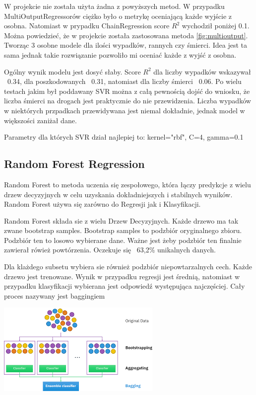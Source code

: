 \documentclass{article}
\begin{document}
W projekcie nie została użyta żadna z powyższych metod. W przypadku MultiOutputRegressorów ciężko było o metrykę oceniającą każde wyjście z osobna. Natomiast w prypadku ChainRegression score \(R^2\) wychodził poniżej 0.1. 
Można powiedzieć, że w projekcie została zastosowana metoda \ref{fig:multioutput}. Tworząc 3 osobne modele dla ilości wypadków, rannych czy śmierci. Idea jest ta sama jednak takie rozwiązanie pozwoliło mi oceniać każde z wyjść z osobna.

Ogólny wynik modelu jest dosyć słaby. Score \(R^2\) dla liczby wypadków wskazywał ~0.34, dla poszkodowanych ~0.31, natomiast dla liczby śmierci ~0.06. Po wielu testach jakim był poddawany SVR można z całą pewnością dojść do wniosku, że liczba śmierci na drogach jest praktycznie do nie przewidzenia. Liczba wypadków w niektórych przpadkach przewidywana jest niemal dokładnie, jednak model w większości zaniżał dane.

Parametry dla których SVR dział najlepiej to: kernel="rbf", C=4, gamma=0.1

\subsection{Random Forest Regression}
Random Forest to metoda uczenia się zespołowego, która łączy predykcje z wielu drzew decyzyjnych w celu uzyskania dokładniejszych i stabilnych wyników. Random Forest używa się zarówno do Regresji jak i Klasyfikacji.

Random Forest składa sie z wielu Drzew Decyzyjnych. Każde drzewo ma tak zwane bootstrap samples. Bootstrap samples to podzbiór oryginalnego zbioru. Podzbiór ten to losowo wybierane dane.
Ważne jest żeby podzbiór ten finalnie zawierał rówież powtórzenia. Oczekuje się ~63,2\% unikalnych danych. 

Dla klażdego subsetu wybiera sie również podzbiór niepowtarzalnych cech. Każde drzewo jest trenowane. Wynik w przypadku regresji jest średnią, natomiast w przypadku klasyfikacji wybierana jest odpowiedź występująca najczęściej. Cały proces nazywany jest baggingiem

 \begin{center}
    \includegraphics[scale=1]{images/bagging.png}
    \captionsetup{hypcap=false}
    \label{fig:bagging}
\end{center}
\end{document}
